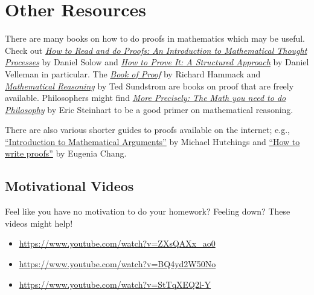 \documentclass[../../../include/open-logic-section]{subfiles}
\begin{document}

\section{Other Resources}

There are many books on how to do proofs in mathematics which may be
useful. Check out
\href{https://www.amazon.ca/How-Read-Proofs-Introduction-Mathematical/dp/1118164024/ref=sr_1_1?ie=UTF8&qid=1474314676&sr=8-1&keywords=an+introduction+to+mathematical+thought+process}{\emph{How
  to Read and do Proofs: An Introduction to Mathematical Thought
  Processes}} by Daniel Solow and
\href{https://www.amazon.ca/How-Prove-Structured-Daniel-Velleman/dp/0521675995}{\emph{How
  to Prove It: A Structured Approach}} by Daniel Velleman in
particular.  The
\href{http://www.people.vcu.edu/~rhammack/BookOfProof/BookOfProof.pdf}{\emph{Book
  of Proof}} by Richard Hammack and
\href{http://scholarworks.gvsu.edu/cgi/viewcontent.cgi?article=1009&context=books}{\emph{Mathematical
  Reasoning}} by Ted Sundstrom are books on proof that are freely
available.  Philosophers might find
\href{https://www.amazon.ca/More-Precisely-Math-Need-Philosophy/dp/1551119099/ref=sr_1_1?ie=UTF8&qid=1474314425&sr=8-1&keywords=The+math+you+need+to+do+philosophy}{\emph{More
Precisely: The Math you need to do Philosophy}} by Eric Steinhart to be a
good primer on mathematical reasoning. 

There are also various shorter guides to proofs available on the
internet; e.g.,
\href{https://math.berkeley.edu/~hutching/teach/proofs.pdf}{``Introduction
  to Mathematical Arguments''} by Michael Hutchings and
\href{http://cheng.staff.shef.ac.uk/proofguide/proofguide.pdf}{``How to
  write proofs''} by Eugenia Chang.

\subsection{Motivational Videos}

Feel like you have no motivation to do your homework? Feeling down? These
videos might help!

\begin{itemize}
\item \url{https://www.youtube.com/watch?v=ZXsQAXx_ao0}
\item \url{https://www.youtube.com/watch?v=BQ4yd2W50No}
\item \url{https://www.youtube.com/watch?v=StTqXEQ2l-Y}
\end{itemize}
\end{document}
